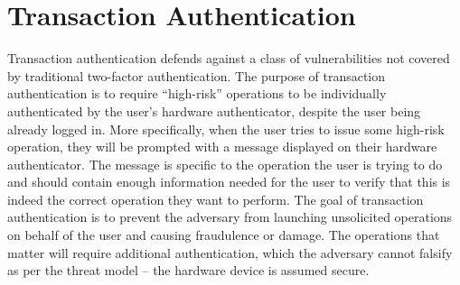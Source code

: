 

\section{Transaction Authentication}

Transaction authentication defends against a class of vulnerabilities not covered by traditional two-factor authentication. The purpose of transaction authentication is to require ``high-risk'' operations to be individually authenticated by the user's hardware authenticator, despite the user being already logged in. More specifically, when the user tries to issue some high-risk operation, they will be prompted with a message displayed on their hardware authenticator. The message is specific to the operation the user is trying to do and should contain enough information needed for the user to verify that this is indeed the correct operation they want to perform. The goal of transaction authentication is to prevent the adversary from launching unsolicited operations on behalf of the user and causing fraudulence or damage. The operations that matter will require additional authentication, which the adversary cannot falsify as per the threat model -- the hardware device is assumed secure. 

